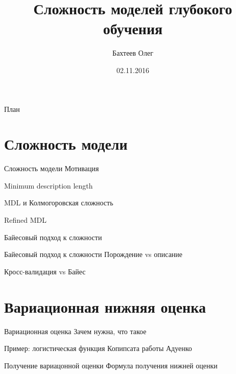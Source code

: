 \documentclass[10pt,pdf,utf8,russian,aspectratio=169]{beamer}
\title[Сложность модели]{Сложность моделей глубокого обучения}
\author{Бахтеев Олег}
\institute{МФТИ}
\date{02.11.2016}
\begin{document}
\begin{frame}
  \titlepage
\end{frame}

\begin{frame}{План}
  \tableofcontents
\end{frame}

\section{Сложность модели}
\begin{frame}{Сложность модели}
Мотивация
\end{frame}


\begin{frame}{Minimum description length}
\end{frame}

\begin{frame}{MDL и Колмогоровская сложность}
\end{frame}

\begin{frame}{Refined MDL}
\end{frame}


\begin{frame}{Байесовый подход к сложности}
\end{frame}

\begin{frame}{Байесовый подход к сложности}
Порождение vs описание
\end{frame}

\begin{frame}{Кросс-валидация vs Байес}
\end{frame}

\section{Вариационная нижняя оценка}
\begin{frame}{Вариационная оценка}
Зачем нужна, что такое
\end{frame}

\begin{frame}{Пример: логистическая функция}
Копипсата работы Адуенко
\end{frame}

\begin{frame}{Получение вариацонной оценки}
Формула получения нижней оценки
\end{frame}
\end{document}
